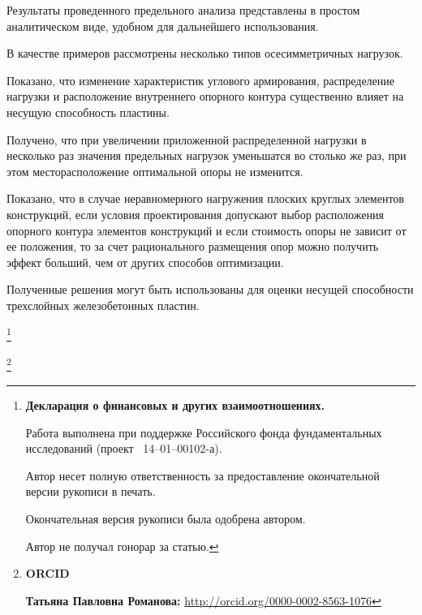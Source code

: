 Результаты проведенного предельного анализа представлены в простом аналитическом виде, удобном для дальнейшего использования.

В качестве примеров рассмотрены несколько типов осесимметричных нагрузок.

Показано, что изменение характеристик углового армирования, распределение нагрузки и расположение внутреннего опорного контура существенно влияет на несущую способность пластины.

Получено, что при увеличении приложенной распределенной нагрузки в несколько раз значения предельных нагрузок уменьшатся во столько же раз, при этом месторасположение оптимальной опоры не изменится.



Показано, что в случае неравномерного нагружения плоских круглых элементов конструкций, если условия проектирования допускают выбор расположения опорного контура элементов конструкций и если стоимость опоры не зависит от ее положения, то за счет рационального размещения опор можно получить эффект больший, чем от других способов оптимизации.

Полученные решения могут быть использованы для оценки несущей способности трехслойных железобетонных пластин.







\thanks{{\bf Декларация о финансовых и других взаимоотношениях.}

Работа выполнена при поддержке  Российского фонда фундаментальных исследований (проект \No~14--01--00102-а).

Автор несет полную ответственность за предоставление окончательной версии рукописи в печать.

Окончательная версия рукописи была одобрена автором.

Автор не получал гонорар за статью.

}







\thanks{{\bf ORCID}



{\bf  Татьяна Павловна Романова:}    \url{http://orcid.org/0000-0002-8563-1076}



}



\pagebreak











